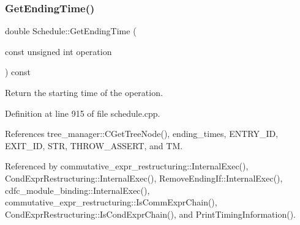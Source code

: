 \subsubsection{\texorpdfstring{Get\+Ending\+Time()}{GetEndingTime()}}
{\footnotesize\ttfamily double Schedule\+::\+Get\+Ending\+Time (\begin{DoxyParamCaption}\item[{const unsigned int}]{operation }\end{DoxyParamCaption}) const}



Return the starting time of the operation. 



Definition at line 915 of file schedule.\+cpp.



References tree\+\_\+manager\+::\+C\+Get\+Tree\+Node(), ending\+\_\+times, E\+N\+T\+R\+Y\+\_\+\+ID, E\+X\+I\+T\+\_\+\+ID, S\+TR, T\+H\+R\+O\+W\+\_\+\+A\+S\+S\+E\+RT, and TM.



Referenced by commutative\+\_\+expr\+\_\+restructuring\+::\+Internal\+Exec(), Cond\+Expr\+Restructuring\+::\+Internal\+Exec(), Remove\+Ending\+If\+::\+Internal\+Exec(), cdfc\+\_\+module\+\_\+binding\+::\+Internal\+Exec(), commutative\+\_\+expr\+\_\+restructuring\+::\+Is\+Comm\+Expr\+Chain(), Cond\+Expr\+Restructuring\+::\+Is\+Cond\+Expr\+Chain(), and Print\+Timing\+Information().


